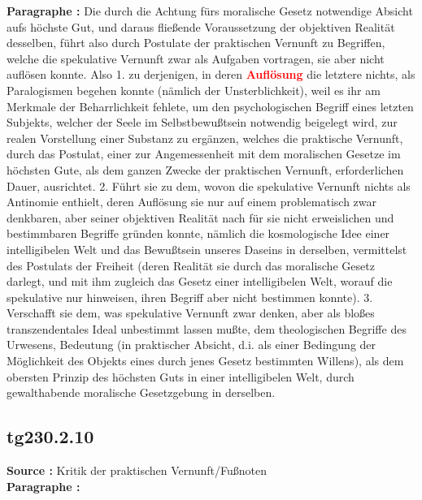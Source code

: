 \documentclass[a4paper,12pt,twoside]{book}
\newcommand{\match}[1]{\textcolor{red}{\textbf{#1}}}
\begin{document}
	\noindent\textbf{Paragraphe : }
	Die durch die Achtung fürs moralische Gesetz notwendige Absicht aufs höchste Gut, und daraus fließende Voraussetzung der objektiven Realität desselben, führt also durch Postulate der praktischen Vernunft zu Begriffen, welche die spekulative Vernunft zwar als Aufgaben vortragen, sie aber nicht auflösen konnte. Also 1. zu derjenigen, in deren \match{Auflösung} die letztere nichts, als Paralogismen begehen konnte (nämlich der Unsterblichkeit), weil es ihr am Merkmale der Beharrlichkeit fehlete, um den psychologischen Begriff eines letzten Subjekts, welcher der Seele im Selbstbewußtsein notwendig beigelegt wird, zur realen Vorstellung einer Substanz zu ergänzen, welches die praktische Vernunft, durch das Postulat, einer zur Angemessenheit mit dem moralischen Gesetze im höchsten Gute, als dem ganzen Zwecke der praktischen Vernunft, erforderlichen Dauer, ausrichtet. 2. Führt sie zu dem, wovon die spekulative Vernunft nichts als Antinomie enthielt, deren Auflösung sie nur auf einem problematisch zwar denkbaren, aber seiner objektiven Realität nach für sie nicht erweislichen und bestimmbaren Begriffe gründen konnte, nämlich die kosmologische Idee einer intelligibelen Welt und das Bewußtsein unseres Daseins in derselben, vermittelst des Postulats der Freiheit (deren Realität sie durch das moralische Gesetz darlegt, und mit ihm zugleich das Gesetz einer intelligibelen Welt, worauf die spekulative nur hinweisen, ihren Begriff aber nicht bestimmen konnte). 3. Verschafft sie dem, was spekulative Vernunft zwar denken, aber als bloßes transzendentales Ideal unbestimmt lassen mußte, dem theologischen Begriffe des Urwesens, Bedeutung (in praktischer Absicht, d.i. als einer Bedingung der Möglichkeit des Objekts eines durch jenes Gesetz bestimmten Willens), als dem obersten Prinzip des höchsten Guts in einer intelligibelen Welt, durch gewalthabende moralische Gesetzgebung in derselben. 
	
	\subsection*{tg230.2.10} 
	\textbf{Source : }Kritik der praktischen Vernunft/Fußnoten\\  
	
	\noindent\textbf{Paragraphe : }
	
\end{document}
